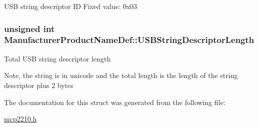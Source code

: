 \-U\-S\-B string descriptor \-I\-D \-Fixed value\-: 0x03 \hypertarget{struct_manufacturer_product_name_def_a78178464ccb77610a03691701cca017e}{
\subsubsection[{\-U\-S\-B\-String\-Descriptor\-Length}]{\setlength{\rightskip}{0pt plus 5cm}unsigned int {\bf \-Manufacturer\-Product\-Name\-Def\-::\-U\-S\-B\-String\-Descriptor\-Length}}}\label{struct_manufacturer_product_name_def_a78178464ccb77610a03691701cca017e}
\-Total \-U\-S\-B string descriptor length

\-Note, the string is in unicode and the total length is the length of the string descriptor plus 2 bytes 

\-The documentation for this struct was generated from the following file\-:\begin{DoxyCompactItemize}
\item 
\hyperlink{mcp2210_8h}{mcp2210.\-h}\end{DoxyCompactItemize}
